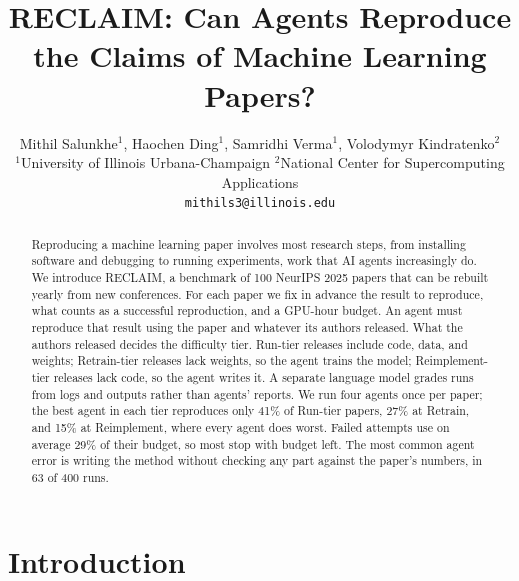 \documentclass{article} %
\title{RECLAIM: Can Agents Reproduce the Claims of Machine Learning Papers?}
\author{Mithil Salunkhe$^{1}$, Haochen Ding$^{1}$, Samridhi Verma$^{1}$, Volodymyr Kindratenko$^{2}$ \\
{\small $^{1}$University of Illinois Urbana-Champaign \quad $^{2}$National Center for Supercomputing Applications} \\
{\small \texttt{mithils3@illinois.edu}}
}
\begin{document}
\raggedbottom

\maketitle
\vspace{-11pt}

\begin{abstract}
Reproducing a machine learning paper involves most research steps, from
installing software and debugging to running experiments, work that AI agents
increasingly do. We introduce RECLAIM, a benchmark of 100 NeurIPS 2025 papers
that can be rebuilt yearly from new conferences. For each paper we fix in
advance the result to reproduce, what counts as a successful reproduction, and
a GPU-hour budget. An agent must reproduce that result using the paper and
whatever its authors released. What the authors released decides the
difficulty tier. Run-tier releases include code, data, and weights;
Retrain-tier releases lack weights, so the agent trains the model;
Reimplement-tier releases lack code, so the agent writes it. A separate
language model grades runs from logs and outputs rather than agents' reports.
We run four agents once per paper; the best agent in each tier reproduces only
41\% of Run-tier papers, 27\% at Retrain, and 15\% at Reimplement, where every
agent does worst. Failed attempts use on average 29\% of their budget, so most
stop with budget left. The most common agent error is writing the method
without checking any part against the paper's numbers, in 63 of 400
runs.
\end{abstract}

\section{Introduction}
\label{sec:introduction}
\end{document}
